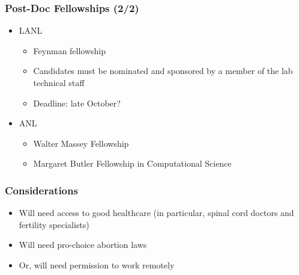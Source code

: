 \documentclass{beamer}
\begin{document}
\begin{frame}
\frametitle{Post-Doc Fellowships (2/2)}

  \begin{itemize}
    \item
      LANL
      \begin{itemize}
        \item
          Feynman fellowship
        \item
          Candidates must be nominated and sponsored by a member
          of the lab technical staff
        \item
          Deadline: late October?
      \end{itemize}
    \item
      ANL
      \begin{itemize}
        \item
          Walter Massey Fellowship
        \item
          Margaret Butler Fellowship in Computational Science
      \end{itemize}
  \end{itemize}

\end{frame}

\begin{frame}
\frametitle{Considerations}

  \begin{itemize}
    \item
      Will need access to good healthcare
      (in particular, spinal cord doctors and fertility specialists)
    \item
      Will need pro-choice abortion laws
    \item
      Or, will need permission to work remotely
  \end{itemize}
\end{frame}
\end{document}
